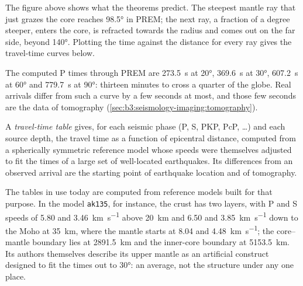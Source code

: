 The figure above shows what the theorems predict. The steepest mantle ray that
just grazes the core reaches \ang{98.5} in PREM; the next ray, a fraction of a
degree steeper, enters the core, is refracted towards the radius and comes out
on the far side, beyond \ang{140}. Plotting the time against the distance for
every ray gives the travel-time curves below.

The computed P times through PREM are \qty{273.5}{s} at \ang{20},
\qty{369.6}{s} at \ang{30}, \qty{607.2}{s} at \ang{60} and \qty{779.7}{s} at
\ang{90}: thirteen minutes to cross a quarter of the globe.
Real arrivals differ from such a curve by a few seconds at most, and those few
seconds are the data of tomography (\cref{sec:b3:seismology-imaging:tomography}).

\begin{definition}\label{def:b3:seismology-imaging:tables}
A \emph{travel-time table} gives, for each seismic
phase (P, S, PKP, PcP, \dots) and each source depth, the travel time as a
function of epicentral distance, computed from a spherically symmetric
reference model whose speeds were themselves adjusted to fit the times of a
large set of well-located earthquakes. Its differences from an observed
arrival are the starting point of earthquake location and of tomography.
\end{definition}

The tables in use today are computed from reference models built for that
purpose. In the model \texttt{ak135}, for instance, the crust has two layers,
with P and S speeds of 5.80 and \qty{3.46}{km.s^{-1}} above \qty{20}{km} and
6.50 and \qty{3.85}{km.s^{-1}} down to the Moho at \qty{35}{km}, where the
mantle starts at 8.04 and \qty{4.48}{km.s^{-1}}; the core--mantle boundary lies
at \qty{2891.5}{km} and the inner-core boundary at \qty{5153.5}{km}.
Its authors themselves describe its upper mantle as an artificial construct
designed to fit the times out to \ang{30}: an average, not the structure under
any one place.


